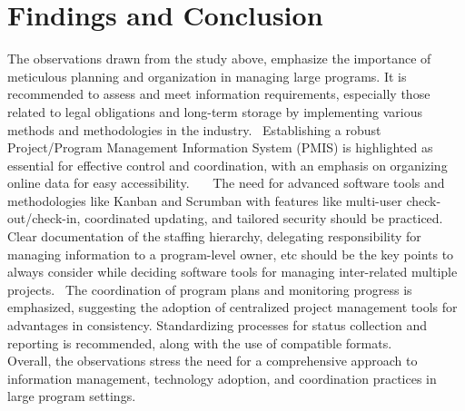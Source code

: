 \documentclass{llncs}
\begin{document}
\section{Findings and Conclusion}
The observations drawn from the study above, emphasize the importance of meticulous planning and organization in managing large programs. It is recommended to assess and meet information requirements, especially those related to legal obligations and long-term storage by implementing various methods and methodologies in the industry.~\cite{refpaper8} Establishing a robust Project/Program Management Information System (PMIS) is highlighted as essential for effective control and coordination, with an emphasis on organizing online data for easy accessibility. ~\cite{refpaper8}~\cite{refpaper1}~\cite{refpaper2}The need for advanced software tools and methodologies like Kanban and Scrumban with features like multi-user check-out/check-in, coordinated updating, and tailored security should be practiced. Clear documentation of the staffing hierarchy, delegating responsibility for managing information to a program-level owner, etc should be the key points to always consider while deciding software tools for managing inter-related multiple projects.~\cite{refpaper8} The coordination of program plans and monitoring progress is emphasized, suggesting the adoption of centralized project management tools for advantages in consistency. Standardizing processes for status collection and reporting is recommended, along with the use of compatible formats. \\
Overall, the observations stress the need for a comprehensive approach to information management, technology adoption, and coordination practices in large program settings.~\cite{refpaper8}~\cite{refpaper2}~\cite{refpaper10}
\end{document}
